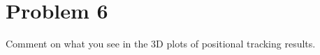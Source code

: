 \documentclass[12pt,a4paper]{article}
\begin{document}
	\section*{Problem 6}
	
	Comment on what you see in the 3D plots of positional tracking results.
	
	
	
\end{document}
